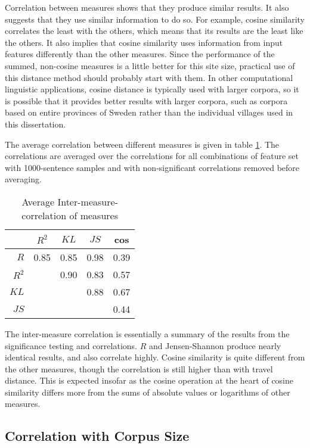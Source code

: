 Correlation between measures shows that they produce similar
results. It also suggests that they use similar information to do
so. For example, cosine similarity correlates the least with the
others, which means that its results are the least like the
others. It also implies that cosine similarity uses information from
input features differently than the other measures. Since the
performance of the summed, non-cosine measures is a little better for
this site size, practical use of this distance method should probably
start with them. In other computational linguistic applications,
cosine distance is typically used with larger corpora, so it is
possible that it provides better results with larger corpora, such as
corpora based on entire provinces of Sweden rather than the individual
villages used in this dissertation.

The average correlation between different measures is given in table
\ref{self-correlation-measures}. The correlations are averaged over
the correlations for all combinations of feature set with
1000-sentence samples and with non-significant correlations removed
before averaging.

\begin{table}
  \begin{tabular}{r|cccc}
    & $R^2$ & $KL$ & $JS$ & cos \\ \hline
    $R$ & 0.85 & 0.85 & 0.98 & 0.39\\
    $R^2$&& 0.90 & 0.83 & 0.57\\
    $KL$ &&& 0.88 & 0.67\\
    $JS$ &&&& 0.44
  \end{tabular}
  \caption{Average Inter-measure-correlation of measures}
  \label{self-correlation-measures}
\end{table}

The inter-measure correlation is essentially a summary of the
results from the significance testing and correlations. $R$ and
Jensen-Shannon produce nearly identical results, and also correlate
highly. Cosine similarity is quite different from the other measures,
though the correlation is still higher than with travel distance. This
is expected insofar as the cosine operation at the heart of cosine similarity
differs more from the sums of absolute values or logarithms of other
measures.

\subsection{Correlation with Corpus Size}

